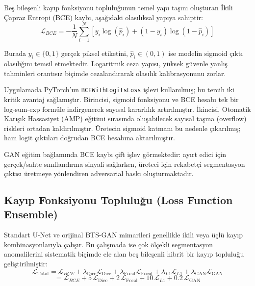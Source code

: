 \documentclass[10pt,journal,compsoc]{IEEEtran}
\begin{document}
Beş bileşenli kayıp fonksiyonu topluluğunun temel yapı taşını oluşturan İkili Çapraz Entropi (BCE) kaybı, aşağıdaki olasılıksal yapıya sahiptir:
\begin{equation}
\mathcal{L}_{BCE} = -\frac{1}{N}\sum_{i=1}^{N}\left[y_i \log(\hat{p}_i) + (1-y_i)\log(1-\hat{p}_i)\right]
\end{equation}

Burada $y_i \in \{0,1\}$ gerçek piksel etiketini, $\hat{p}_i \in (0,1)$ ise modelin sigmoid çıktı olasılığını temsil etmektedir. Logaritmik ceza yapısı, yüksek güvenle yanlış tahminleri orantısız biçimde cezalandırarak olasılık kalibrasyonunu zorlar.

Uygulamada PyTorch'un \texttt{BCEWithLogitsLoss} işlevi kullanılmış; bu tercih iki kritik avantaj sağlamıştır. Birincisi, sigmoid fonksiyonu ve BCE hesabı tek bir log-sum-exp formüle indirgenerek sayısal kararlılık artırılmıştır. İkincisi, Otomatik Karışık Hassasiyet (AMP) eğitimi sırasında oluşabilecek sayısal taşma (overflow) riskleri ortadan kaldırılmıştır. Üretecin sigmoid katmanı bu nedenle çıkarılmış; ham logit çıktıları doğrudan BCE hesabına aktarılmıştır.

GAN eğitim bağlamında BCE kaybı çift işlev görmektedir: ayırt edici için gerçek/sahte sınıflandırma sinyali sağlarken, üreteci için rekabetçi segmentasyon çıktısı üretmeye yönlendiren adversarial baskı oluşturmaktadır.

\subsection{Kayıp Fonksiyonu Topluluğu \textnormal{\small{(Loss Function Ensemble)}}}

Standart U-Net ve orijinal BTS-GAN mimarileri genellikle ikili veya üçlü kayıp kombinasyonlarıyla çalışır. Bu çalışmada ise çok ölçekli segmentasyon anomalilerini sistematik biçimde ele alan beş bileşenli hibrit bir kayıp topluluğu geliştirilmiştir:
\begin{equation}
\mathcal{L}_{\text{Total}} = \mathcal{L}_{BCE} + \lambda_{\text{Dice}}\mathcal{L}_{\text{Dice}} + \lambda_{\text{Focal}}\mathcal{L}_{\text{Focal}} + \lambda_{L1}\mathcal{L}_{L1} + \lambda_{\text{GAN}}\mathcal{L}_{\text{GAN}}
\end{equation}
\begin{equation}
= \mathcal{L}_{BCE} + 5\,\mathcal{L}_{\text{Dice}} + 2\,\mathcal{L}_{\text{Focal}} + 10\,\mathcal{L}_{L1} + 0.2\,\mathcal{L}_{\text{GAN}}
\end{equation}
\end{document}
